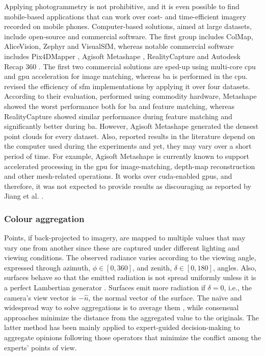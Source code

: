 Applying photogrammetry is not prohibitive, and it is even possible to find mobile-based applications that can work over cost- and time-efficient imagery recorded on mobile phones. Computer-based solutions, aimed at large datasets, include open-source and commercial software. The first group includes ColMap, AliceVision, Zephyr and VisualSfM, whereas notable commercial software includes Pix4DMapper \cite{zheng_thermal_2020}, Agisoft Metashape \cite{grechi_3d_2021}, RealityCapture and Autodesk Recap 360 \cite{lafi_3d_2017}. The first two commercial solutions are sped-up using multi-core \acrshort{cpu} and \acrshort{gpu} acceleration for image matching, whereas \acrshort{ba} is performed in the \acrshort{cpu}. \cite{jiang_efficient_2020} revised the efficiency of \acrshort{sfm} implementations by applying it over four datasets. According to their evaluation, performed using commodity hardware, Metashape showed the worst performance both for \acrshort{ba} and feature matching, whereas RealityCapture showed similar performance during feature matching and significantly better during \acrshort{ba}. However, Agisoft Metashape generated the densest point clouds for every dataset. Also, reported results in the literature depend on the computer used during the experiments and yet, they may vary over a short period of time. For example, Agisoft Metashape is currently known to support accelerated processing in the \acrshort{gpu} for image-matching, depth-map reconstruction and other mesh-related operations. It works over \acrshort{cuda}-enabled \acrshort{gpu}s, and therefore, it was not expected to provide results as discouraging as reported by Jiang et al. \cite{jiang_efficient_2020}.

\subsubsection{Colour aggregation}

Points, if back-projected to imagery, are mapped to multiple values that may vary one from another since these are captured under different lighting and viewing conditions. The observed radiance varies according to the viewing angle, expressed through azimuth, $\phi \in [0, 360]$, and zenith, $\delta \in [0, 180]$, angles. Also, surfaces behave so that the emitted radiation is not spread uniformly unless it is a perfect Lambertian generator \cite{vollmer_infrared_2017}. Surfaces emit more radiation if $\delta = 0$, i.e., the camera's view vector is $-\hat{n}$, the normal vector of the surface. The naïve and widespread way to solve aggregations is to average them \cite{javadnejad_photogrammetric_2020, hoegner_3d_2016}, while consensual approaches minimize the distance from the aggregated value to the originals. The latter method has been mainly applied to expert-guided decision-making to aggregate opinions following those operators that minimize the conflict among the experts' points of view.

